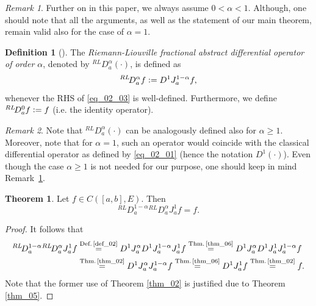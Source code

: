 \documentclass[reqno]{amsart}
\numberwithin{equation}{section}
\theoremstyle{definition}
\newtheorem{definition}{Definition}
\newtheorem{theorem}{Theorem}
\theoremstyle{remark}
\newtheorem{remark}{Remark}
\newcommand{\br}[1]{\left(#1\right)}
\newcommand{\C}[2]{C\br{#1,#2}}
\newcommand{\D}[1]{D^1#1}
\newcommand{\defRef}[1]{\textrm{Def.\,\ref{#1}}}
\newcommand{\defeq}{\vcentcolon=}
\newcommand{\DRL}[3]{{}^{RL}\!D^{#1}_{#2}{#3}}
\newcommand{\eqText}[1]{\stackrel{#1}{=}}
\newcommand{\JRL}[3]{J^{#1}_{#2}{#3}}
\newcommand{\remarkRef}[1]{\textrm{Remark \,\ref{#1}}}
\newcommand{\sbr}[1]{\left[#1\right]}
\newcommand{\theoremRef}[1]{\textrm{Theorem \ref{#1}}}
\newcommand{\thmRef}[1]{\textrm{Thm.\,\ref{#1}}}
\begin{document}
	\begin{remark}\label{rem_03}
		Further on in this paper, we always assume $0<\alpha<1$. Although, one should note that all the arguments, as well as the statement of our main theorem, remain valid also for the case of $\alpha=1$.
	\end{remark}
	\begin{definition}[]\label{def_02}
		The \textit{Riemann-Liouville fractional abstract differential operator of order $\alpha$}, denoted by $\DRL{\alpha}{a}{\br{\cdot}}$, is defined as
		\begin{equation}\label{eq_02_03}
			\DRL{\alpha}{a}{f}\defeq\D{\JRL{1-\alpha}{a}{f}},
		\end{equation}
		whenever the RHS of \eqref{eq_02_03} is well-defined. Furthermore, we define $\DRL{0}{a}{f}\defeq{f}$ (i.e. the identity operator).
	\end{definition}
	\begin{remark}
		Note that $\DRL{\alpha}{a}{\br{\cdot}}$ can be analogously defined also for $\alpha\geq1$. Moreover, note that for $\alpha=1$, such an operator would coincide with the classical differential operator as defined by \eqref{eq_02_01} (hence the notation $\D{\br{\cdot}}$). Even though the case $\alpha\geq1$ is not needed for our purpose, one should keep in mind \remarkRef{rem_03}.
	\end{remark}
	\begin{theorem}\label{thm_07}
		Let $f\in\C{\sbr{a,b}}{E}$. Then
		\begin{equation*}
			\DRL{1-\alpha}{a}{\DRL{\alpha}{a}{\JRL{1}{a}{f}}}=f.
		\end{equation*}
	\end{theorem}
	\begin{proof}
	It follows that
	\begin{equation*}
		\begin{aligned}
			\DRL{1-\alpha}{a}{\DRL{\alpha}{a}{\JRL{1}{a}{f}}}&\eqText{\defRef{def_02}}\D{\JRL{\alpha}{a}{\D{\JRL{1-\alpha}{a}{\JRL{1}{a}{f}}}}}\eqText{\thmRef{thm_06}}\D{\JRL{\alpha}{a}{\D{\JRL{1}{a}{\JRL{1-\alpha}{a}{f}}}}}\\
			&\eqText{\thmRef{thm_02}}\D{\JRL{\alpha}{a}{\JRL{1-\alpha}{a}{f}}}\eqText{\thmRef{thm_06}}\D{\JRL{1}{a}{f}}\eqText{\thmRef{thm_02}}f.
		\end{aligned}
	\end{equation*}
	Note that the former use of \theoremRef{thm_02} is justified due to \theoremRef{thm_05}.
	\end{proof}
\end{document}
